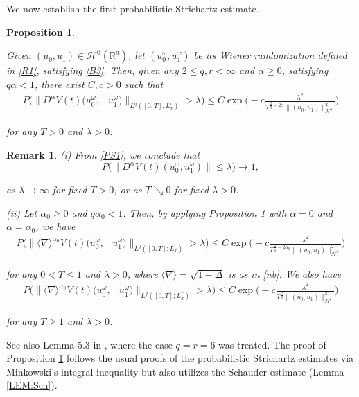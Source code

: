 \documentclass[letterpaper, 11pt,  reqno]{amsart}
\newtheorem{proposition}[theorem]{Proposition}
\newtheorem{remark}[theorem]{Remark}
\newcommand{\1}{\hspace{0.5mm}\text{I}\hspace{0.2mm}}
\newcommand{\noi}{\noindent}
\newcommand{\R}{\mathbb{R}}
\newcommand{\al}{\alpha}
\newcommand{\nb}{\nabla}
\newcommand{\Dl}{\Delta}
\newcommand{\ld}{\lambda}
\renewcommand{\o}{\omega}
\newcommand{\jb}[1]
{\langle #1 \rangle}
\renewcommand{\H}{\mathcal{H}}
\newcommand{\too}{\longrightarrow}
\numberwithin{equation}{section}
\numberwithin{theorem}{section}
\begin{document}
We now establish the first probabilistic Strichartz estimate.


\begin{proposition}\label{PROP:PS}

Given $(u_0, u_1) \in \H^0(\R^d)$, 
let $(u_0^\o, u_1^\o)$ be its Wiener randomization defined in \eqref{R1}, 
satisfying \eqref{B3}.
Then,
given any $2\leq q, r<\infty$ and $\al \geq  0$, 
satisfying $q\al < 1$, 
there exist $C, c>0$ such that
\begin{align}
P\Big(\|D^\al V(t) (u_0^\o,&  u_1^\o) \|_{L^q([0, T]; L^r_x)}> \ld\Big)
\leq C\exp\Bigg(-c\frac{\ld^2}{T^{\frac 2 q -2\al } \|   (u_0, u_1)  \|_{\H^0}^{2}}\Bigg)
\label{PS1}
\end{align}
	
\noi
for any $T > 0$ and $\ld > 0$.



\end{proposition}

\begin{remark}\label{REM:PS1}\rm
(i) From \eqref{PS1}, 
we conclude that 
\[ P\Big( \|D^\al V(t) (u_0^\o,  u_1^\o)\| \le  \lambda \Big) \too 1, \]

\noi
 as $\lambda \to \infty$ for fixed $T > 0$, or as $T \searrow 0$ for fixed $\lambda > 0$. 

\smallskip

\noi
(ii) Let $\al_0 \ge 0$ and $q\al_0 < 1$. Then,  by applying Proposition \ref{PROP:PS}
with $\al = 0$ and $\al = \al_0$,  we have 
\begin{align}
P\Big(\|\jb{\nb}^{\al_0} V(t) (u_0^\o,&  u_1^\o) \|_{L^q([0, T]; L^r_x)}> \ld\Big)
\leq C\exp\Bigg(-c\frac{\ld^2}{T^{\frac 2 q -2\al_0 } \|   (u_0, u_1)  \|_{\H^0}^{2}}\Bigg)
\label{PS1a}
\end{align}
	
\noi
for any $0 < T \le 1$ and $\ld > 0$, 
where $\jb{\nb} = \sqrt {1-\Dl}$ is as in \eqref{nb}.
We also have 
\begin{align}
P\Big(\|\jb{\nb}^{\al_0} V(t) (u_0^\o,&  u_1^\o) \|_{L^q([0, T]; L^r_x)}> \ld\Big)
\leq C\exp\Bigg(-c\frac{\ld^2}{T^{\frac 2 q  } \|   (u_0, u_1)  \|_{\H^0}^{2}}\Bigg)
\label{PS1b}
\end{align}


\noi
for any $ T \ge 1$ and $\ld > 0$.


\end{remark}


See also Lemma 5.3 in \cite{KC}, 
where the case  $q = r = 6$ was treated.
The proof of Proposition \ref{PROP:PS} follows the usual proofs of the probabilistic Strichartz estimates via Minkowski's integral inequality \cite{BT1, CO, BOP1}
but also utilizes 
 the Schauder estimate (Lemma \ref{LEM:Sch}).
\end{document}
